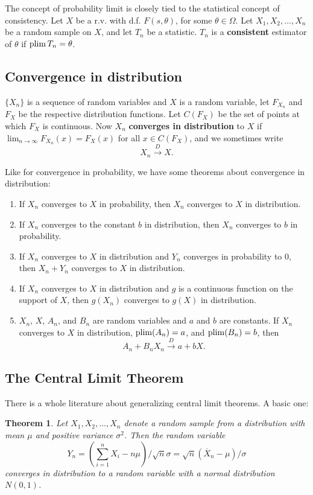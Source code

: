 \documentclass[twoside]{article}
\newtheorem{theorem}{Theorem}%
\begin{document}
The concept of probability limit is closely tied to the statistical concept
of consistency. Let $X$ be a r.v. with d.f. $F(s,\theta)$, for some $\theta\in\Omega$.
Let $X_1,X_2,\dots,X_n$ be a random sample on $X$, and let $T_n$ be a statistic.
$T_n$ is a \textbf{consistent} estimator of $\theta$ if $\operatorname{plim} T_n = \theta$.

\subsection{Convergence in distribution}
$\{X_n\}$ is a sequence of random variables and $X$ is a random variable,
let $F_{X_n}$ and $F_X$ be the respective distribution functions. Let 
$C(F_X)$ be the set of points at which $F_X$ is continuous. Now $X_n$ \textbf{converges in
distribution} to $X$ if $\lim_{n\rightarrow\infty} F_{X_n}(x) = F_X(x)$ for all
$x\in C(F_X)$, and we sometimes write \[X_n \xrightarrow{D} X.\]

Like for convergence in probability, we have some theorems about convergence in distribution:

\begin{enumerate}
\item If $X_n$ converges to $X$ in probability, then $X_n$ converges to $X$ in distribution.
\item If $X_n$ converges to the constant $b$ in distribution, then $X_n$
converges to $b$ in probability.
\item If $X_n$ converges to $X$ in distribution and $Y_n$ converges in probability to $0$,
then $X_n+Y_n$ converges to $X$ in distribution.
\item If $X_n$ converges to $X$ in distribution and $g$ is a continuous function on the support
of $X$, then $g(X_n)$ converges to $g(X)$ in distribution.
\item $X_n$, $X$, $A_n$, and $B_n$ are random variables and $a$ and $b$ are constants. 
If $X_n$ converges to $X$ in distribution, $\operatorname{plim}(A_n)=a$, and $\operatorname{plim}(B_n)=b$, then
\[ A_n + B_n X_n \xrightarrow{D} a + bX.\]
\end{enumerate}


\subsection{The Central Limit Theorem}
There is a whole literature about generalizing central limit theorems. A basic one:

\begin{theorem}
Let $X_1,X_2,\dots,X_n$ denote a random sample from a distribution with mean
$\mu$ and positive variance $\sigma^2$. Then the random variable \[ Y_n =
\left(\sum_{i=1}^n X_i - n\mu \right)/\sqrt{n}\sigma =
\sqrt{n}(\overline{X}_n-\mu)/\sigma\] converges in distribution to a random
variable with a normal distribution $N(0,1)$. 
\end{theorem}
\end{document}
